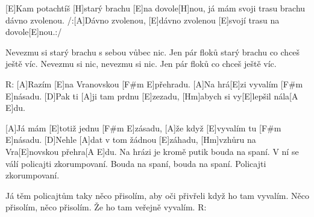 
[E]Kam potachtíš [H]starý brachu [E]na dovole[H]nou,
já mám svoji trasu brachu dávno zvolenou.
/:[A]Dávno zvolenou, [E]dávno zvolenou  
[E]svojí trasu na dovole[E]nou.:/

Nevezmu si starý brachu s sebou vůbec nic.
Jen pár floků starý brachu co chceš ještě víc.
Nevezmu si nic, nevezmu si nic.
Jen pár floků co chceš ještě víc.

R: [A]Razím  [E]na Vranovskou  [F#m E]přehradu.
[A]Na hrá[E]zi vyvalím  [F#m E]násadu.
[D]Pak ti [A]ji tam prdnu  [E]zezadu,
[Hm]abych si vy[E]lepšil nála[A E]du.

[A]Já mám [E]totiž jednu [F#m E]zásadu,
[A]\null že když [E]vyvalím tu [F#m E]násadu.
[D]Nehle [A]dat v tom žádnou [E]záhadu,
[Hm]vzhůru na Vra[E]novskou přehra[A E]du.
\slpc
Na hrázi je kromě putik bouda na spaní.
V ní se válí policajti zkorumpovaní.
Bouda na spaní, bouda na spaní.
Policajti zkorumpovaní.

Já těm policajtům taky něco přisolím,
aby oči přivřeli když ho tam vyvalím.
Něco přisolím, něco přisolím.
Že ho tam veřejně vyvalím.
R:  
